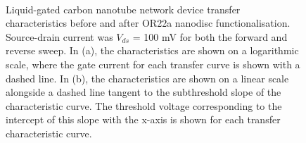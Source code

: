 \documentclass[
  a4paper,
]{scrbook}
\begin{document}
\begin{figure}
\begin{minipage}[t]{0.45\linewidth}
{{}

}

\end{minipage}%
%
\begin{minipage}[t]{0.01\linewidth}

{\centering 

~

}

\end{minipage}%

\caption{\label{fig-OR22a-TX-comparison}Liquid-gated carbon nanotube
network device transfer characteristics before and after OR22a nanodisc
functionalisation. Source-drain current was \(V_{ds}\) = 100 mV for both
the forward and reverse sweep. In (a), the characteristics are shown on
a logarithmic scale, where the gate current for each transfer curve is
shown with a dashed line. In (b), the characteristics are shown on a
linear scale alongside a dashed line tangent to the subthreshold slope
of the characteristic curve. The threshold voltage corresponding to the
intercept of this slope with the x-axis is shown for each transfer
characteristic curve.}

\end{figure}
\end{document}
